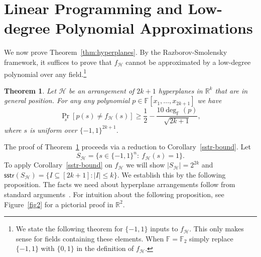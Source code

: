 \documentclass[11pt]{article}
\newtheorem{theorem}{Theorem}[section]
\theoremstyle{definition}
\newcommand{\1}{\mathbf{1}}
\newcommand{\R}{{\mathbb R}}
\newcommand{\F}{{\mathbb F}}
\renewcommand{\leq}{\leqslant}
\renewcommand{\geq}{\geqslant}
\newcommand{\sstr}{\mathsf{sstr}}
\begin{document}
\section{Linear Programming and Low-degree Polynomial Approximations}\label{sec:hyperplanes}\label{section:lp}
We now prove Theorem~\ref{thm:hyperplanes}.    By the Razborov-Smolensky framework, it suffices to prove that $f_\mathcal{H}$ cannot be approximated by a low-degree polynomial over any field.\footnote{We state the following theorem for $\{-1,1\}$ inputs to $f_{\mathcal{H}}$.  This only makes sense for fields containing these elements.  When $\F = \F_2$ simply replace $\{-1,1\}$ with $\{0,1\}$ in the definition of $f_\mathcal{H}$.}

\begin{theorem}\label{thm:hyperplanes-polynomial}
Let $\mathcal{H}$ be an arrangement of $2k+1$ hyperplanes in $\R^k$ that are in general position. For any any polynomial $p \in \F[x_1,\ldots,x_{2k+1}]$ we have 
\[ \Pr_s[p(s) \neq f_\mathcal{H}(s)] \geq \frac{1}{2} - \frac{10\deg_\F(p)}{\sqrt{2k+1}}, \]
where $s$ is uniform over $\{-1,1\}^{2k+1}$. 
\end{theorem}
\noindent
The proof of Theorem~\ref{thm:hyperplanes-polynomial} proceeds via a reduction to Corollary~\ref{sstr-bound}. 
Let
$$S_\mathcal{H} = \{s\in\{-1,1\}^n:~f_\mathcal{H}(s)=1\}.$$
To apply Corollary~\ref{sstr-bound} on $f_\mathcal{H}$ we will show  
$\lvert S_\mathcal{H}\rvert = 2^{2k}$ and $\sstr(S_\mathcal{H})=\{I\subseteq [2k+1] : \lvert I\rvert\leq k\}$.  
We establish this by the following proposition.  The facts we need about hyperplane arrangements follow from standard arguments~\cite{gartner, stanley}.  For intuition about the following proposition, see Figure~\ref{fig2} for a pictorial proof  in $\R^2$.  
\end{document}
